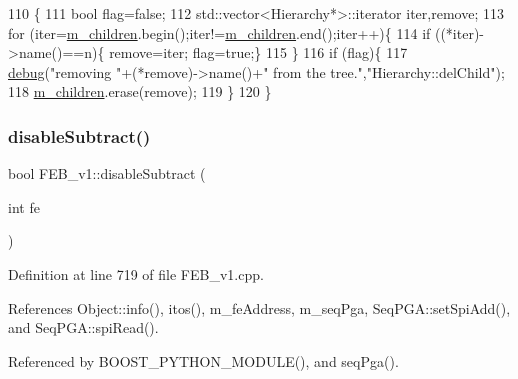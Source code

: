 \begin{DoxyCode}
110                                    \{
111   \textcolor{keywordtype}{bool} flag=\textcolor{keyword}{false};
112   std::vector<Hierarchy*>::iterator iter,\textcolor{keyword}{remove};
113   \textcolor{keywordflow}{for} (iter=\hyperlink{classHierarchy_a038816763941fd4a930504917f60483b}{m\_children}.begin();iter!=\hyperlink{classHierarchy_a038816763941fd4a930504917f60483b}{m\_children}.end();iter++)\{
114     \textcolor{keywordflow}{if} ((*iter)->name()==n)\{ \textcolor{keyword}{remove}=iter; flag=\textcolor{keyword}{true};\}
115   \}
116   \textcolor{keywordflow}{if} (flag)\{
117     \hyperlink{classObject_aac010553f022165573714b7014a15f0d}{debug}(\textcolor{stringliteral}{"removing "}+(*remove)->name()+\textcolor{stringliteral}{" from the tree."},\textcolor{stringliteral}{"Hierarchy::delChild"});
118     \hyperlink{classHierarchy_a038816763941fd4a930504917f60483b}{m\_children}.erase(\textcolor{keyword}{remove});
119   \}
120 \}
\end{DoxyCode}
\mbox{\label{classFEB__v1_a3d224acca0807603d14b72cff6359b3f}} 
\subsubsection{\texorpdfstring{disable\+Subtract()}{disableSubtract()}}
{\footnotesize\ttfamily bool F\+E\+B\+\_\+v1\+::disable\+Subtract (\begin{DoxyParamCaption}\item[{int}]{fe }\end{DoxyParamCaption})}



Definition at line 719 of file F\+E\+B\+\_\+v1.\+cpp.



References Object\+::info(), itos(), m\+\_\+fe\+Address, m\+\_\+seq\+Pga, Seq\+P\+G\+A\+::set\+Spi\+Add(), and Seq\+P\+G\+A\+::spi\+Read().



Referenced by B\+O\+O\+S\+T\+\_\+\+P\+Y\+T\+H\+O\+N\+\_\+\+M\+O\+D\+U\+L\+E(), and seq\+Pga().


